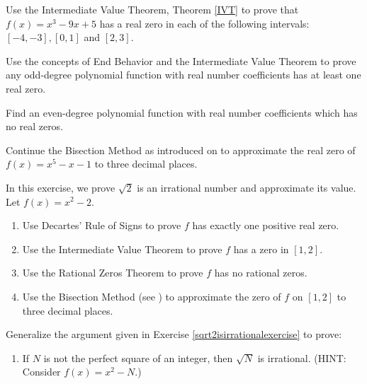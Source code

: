 \begin{exenum}
    
\item Use the Intermediate Value Theorem, Theorem \ref{IVT} to prove that $f(x) = x^{3} - 9x + 5$ has a real zero in each of the following intervals: $[-4, -3], [0, 1]$ and $[2, 3]$.

\item  Use the concepts of End Behavior and the Intermediate Value Theorem to prove any odd-degree polynomial function with real number coefficients has at least one real zero.

\item Find an even-degree polynomial function with real number coefficients which has no real zeros.

\item  \label{bisectionexercise} Continue  the Bisection Method as introduced on  \pageref{bisectionmethod} to approximate the real zero of $f(x) = x^5-x-1$ to three decimal places.

\item  \label{sqrt2isirrationalexercise} In this exercise, we prove $\sqrt{2}$ is an irrational number and approximate its value.  Let $f(x) = x^2-2$.

\begin{enumerate} 

\item Use Decartes' Rule of Signs to prove $f$ has exactly one positive real zero.

 \item Use the Intermediate Value Theorem to prove $f$ has a zero in $[1,2]$.

\item \label{sqrt2isirrationalexercise}  Use the Rational Zeros Theorem to prove $f$ has no rational zeros.

\item  Use the Bisection Method (see  \pageref{bisectionmethod}) to approximate the zero of $f$ on $[1,2]$ to three decimal places.

\end{enumerate}

\item  Generalize the argument given in Exercise \ref{sqrt2isirrationalexercise} to prove:

\begin{enumerate}

\item If $N$ is not the perfect square of an integer, then $\sqrt{N}$ is irrational. (HINT: Consider $f(x) = x^2-N$.)


\end{enumerate}
\end{exenum}
